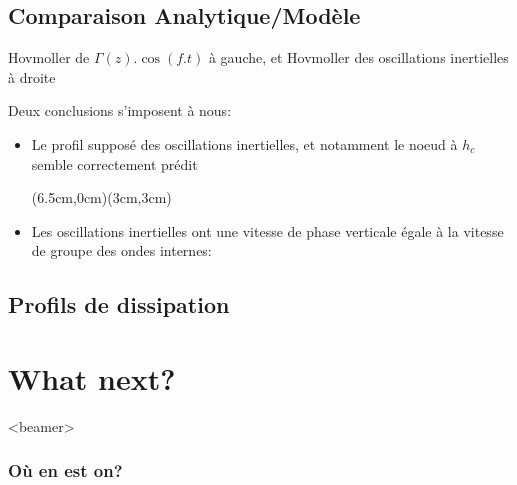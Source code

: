 \documentclass{beamer}
\begin{document}
\subsection{Comparaison Analytique/Modèle}
\frame
{

\scriptsize{Hovmoller de $\Gamma(z) . \cos(f.t)$ à gauche, et Hovmoller des oscillations inertielles à droite}

Deux conclusions s'imposent à nous:
\begin{itemize}
\item<2->{Le profil supposé des oscillations inertielles, et notamment le noeud à \alert{$h_c$} semble correctement prédit}

(6.5cm,0cm)(3cm,3cm)
\item<5->{Les oscillations inertielles ont une vitesse de phase verticale égale à la vitesse de groupe des ondes internes: }\color{black}
\end{itemize}
}

\subsection{Profils de dissipation}
\section{What next?}
  \begin{frame}<beamer>
    \frametitle{Où en est on?}
    \begin{figure}[htbp]
    \end{figure}

  \end{frame}
\end{document}
